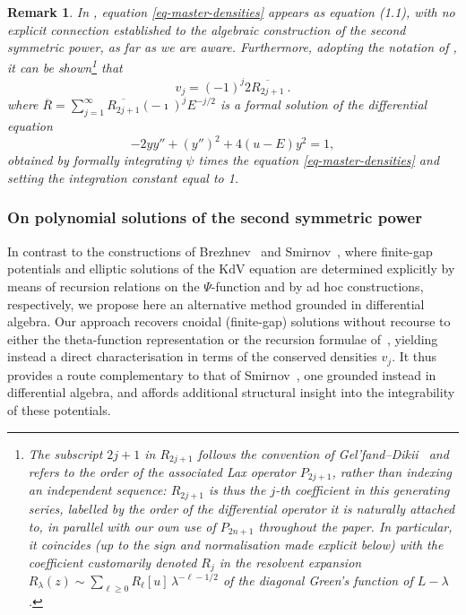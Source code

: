 \documentclass[a4paper,12pt]{article}
\newtheorem{rem}[thm]{Remark}
\begin{document}
\begin{rem}
    In \cite{gel1979integrable}, equation \eqref{eq-master-densities} appears as equation (1.1), with no explicit connection established to the algebraic construction of the second symmetric power, as far as we are aware. Furthermore, adopting the notation of \cite{gel1979integrable}, it can be shown\footnote{The subscript $2j+1$ in $R_{2j+1}$ follows the convention of Gel'fand--Dikii~\cite{gel1979integrable} and refers to the order of the associated Lax operator $P_{2j+1}$, rather than indexing an independent sequence: $R_{2j+1}$ is thus the $j$-th coefficient in this generating series, labelled by the order of the differential operator it is naturally attached to, in parallel with our own use of $P_{2n+1}$ throughout the paper. In particular, it coincides (up to the sign and normalisation made explicit below) with the coefficient customarily denoted $R_j$ in the resolvent expansion $R_\lambda(z)\sim\sum_{\ell\ge 0}R_\ell[u]\,\lambda^{-\ell-1/2}$ of the diagonal Green's function of $L-\lambda$.} that
    \begin{equation*}
        v_j = (-1)^j 2 \overline{R_{2j+1}} \ .
    \end{equation*}
  where $\overline{R} = \sum_{j=1}^\infty \overline{R_{2j+1}} (-\imath )^{j}E^{-j/2}$ is a formal solution of the differential equation
   \begin{equation*}
       -2 y y''+(y'')^2+4(u-E)y^2=1 ,
   \end{equation*}
   obtained by formally integrating $\psi$
 times the equation \eqref{eq-master-densities} and setting the integration constant equal to 1.
\end{rem}

\subsubsection{On polynomial solutions of the second symmetric power}

In contrast to the constructions of Brezhnev~\cite{brezhnev2008does} and Smirnov~\cite{Smi94}, where finite-gap potentials and elliptic solutions of the KdV equation are determined explicitly by means of recursion relations on the $\Psi$-function and by ad hoc constructions, respectively, we propose here an alternative method grounded in differential algebra. Our approach recovers cnoidal (finite-gap) solutions without recourse to either the theta-function representation or the recursion formulae of~\cite{brezhnev2008does}, yielding instead a direct characterisation in terms of the conserved densities $v_j$. It thus provides a route complementary to that of Smirnov~\cite{Smi94}, one grounded instead in  differential algebra, and affords additional structural insight into the integrability of these potentials.
\end{document}
